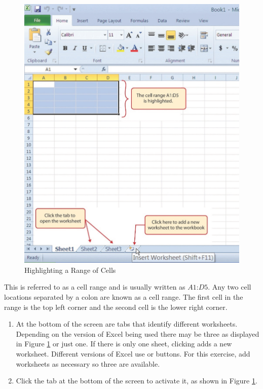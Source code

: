 \begin{figure}[H]
	\centering
	\includegraphics[width=\maxwidth{.95\linewidth}]{gfx/ch01_fig05}
	\caption{Highlighting a Range of Cells}
	\label{01:fig05}
\end{figure}

This is referred to as a cell range and is usually written as $ A1 $:$ D5 $. Any two cell locations separated by a colon are known as a cell range. The first cell in the range is the top left corner and the second cell is the lower right corner.

\begin{enumbox}
	\begin{enumerate}
		\item At the bottom of the screen are tabs that identify different worksheets. Depending on the version of Excel being used there may be three as displayed in Figure \ref{01:fig05} or just one. If there is only one sheet, clicking  adds a new worksheet. Different versions of Excel use \fmtButton{$ + $} or  buttons. For this exercise, add worksheets as necessary so three are available.
		\item Click the  tab at the bottom of the screen to activate it, as shown in Figure \ref{01:fig05}.
	\end{enumerate}
\end{enumbox}

